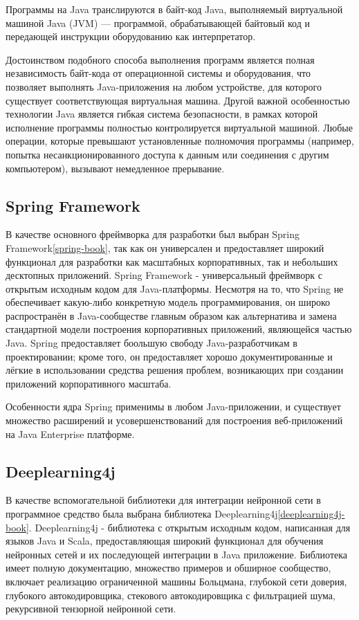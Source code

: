 Программы на Java транслируются в байт-код Java, выполняемый виртуальной машиной Java (JVM) — программой, обрабатывающей байтовый код и передающей инструкции оборудованию как интерпретатор.

Достоинством подобного способа выполнения программ является полная независимость байт-кода от операционной системы и оборудования, что позволяет выполнять Java-приложения на любом устройстве, для которого существует соответствующая виртуальная машина.
Другой важной особенностью технологии Java является гибкая система безопасности, в рамках которой исполнение программы полностью контролируется виртуальной машиной.
Любые операции, которые превышают установленные полномочия программы (например, попытка несанкционированного доступа к данным или соединения с другим компьютером), вызывают немедленное прерывание.

\subsection{Spring Framework}

В качестве основного фреймворка для разработки был выбран Spring Framework\ref{spring-book}, так как он универсален и предоставляет широкий функционал для разработки как масштабных корпоративных, так и небольших десктопных приложений.
Spring Framework - универсальный фреймворк с открытым исходным кодом для Java-платформы.
Несмотря на то, что Spring не обеспечивает какую-либо конкретную модель программирования, он широко распространён в Java-сообществе главным образом как альтернатива и замена стандартной модели построения корпоративных приложений, являющейся частью Java.
Spring предоставляет боольшую свободу Java-разработчикам в проектировании; кроме того, он предоставляет хорошо документированные и лёгкие в использовании средства решения проблем, возникающих при создании приложений корпоративного масштаба.

Особенности ядра Spring применимы в любом Java-приложении, и существует множество расширений и усовершенствований для построения веб-приложений на Java Enterprise платформе.

\subsection{Deeplearning4j}

В качестве вспомогательной библиотеки для интеграции нейронной сети в программное средство была выбрана библиотека Deeplearning4j\ref{deeplearning4j-book}.
Deeplearning4j - библиотека с открытым исходным кодом, написанная для языков Java и Scala, предоставляющая широкий функционал для обучения нейронных сетей и их последующей интеграции в Java приложение.
Библиотека имеет полную документацию, множество примеров и обширное сообщество, включает реализацию ограниченной машины Больцмана, глубокой сети доверия, глубокого автокодировщика, стекового автокодировщика с фильтрацией шума, рекурсивной тензорной нейронной сети.

\clearpage